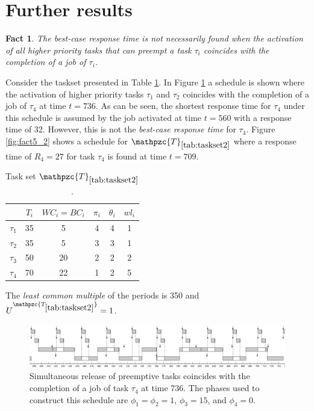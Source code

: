 \documentclass[fleqn]{article}
\newtheorem{fact}{Fact}
\begin{document}
\section*{Further results}

\begin{fact}
	The \textit{best-case response time} is not necessarily found when the activation of all higher priority tasks that can preempt a task $\tau_i$ coincides with the completion of a job of $\tau_i$.
\end{fact}

Consider the taskset presented in Table \ref{tab:taskset2}. In Figure \ref{fig:fact5_1} a schedule is shown where the activation of higher priority tasks $\tau_1$ and $\tau_2$ coincides with the completion of a job of $\tau_4$ at time $t=736$. As can be seen, the shortest response time for $\tau_4$ under this schedule is assumed by the job activated at time $t=560$ with a response time of 32. However, this is not the \textit{best-case response time} for $\tau_4$. Figure \ref{fig:fact5_2} shows a schedule for $\mathpzc{T}_{\ref{tab:taskset2}}$ where a response time of $R_4=27$ for task $\tau_4$ is found at time $t=709$. 
\begin{table}[H]
	\center
	\caption{Task set $\mathpzc{T}_{\ref{tab:taskset2}}$.}
	\label{tab:taskset2}
	\begin{tabular}{c c c c c | c}
		\hline 
		& $T_i$ & $WC_i=BC_i$ & $\pi_i$ & $\theta_i$ &  $wl_i$\\ 
		\hline 
		$\tau_1$& 35 & 5  & 4 & 4 &  1 \\ 
		$\tau_2$& 35 & 5  & 3 & 3 &  1 \\ 
		$\tau_3$& 50 & 20 & 2 & 2 &  2 \\ 
		$\tau_4$& 70 & 22 & 1 & 2 &  5 \\
		\hline 
	\end{tabular}
	\small
	\item The \textit{least common multiple} of the periods is 350 and $U^{\mathpzc{T_{\ref{tab:taskset2}}}}=1$.
\end{table} 

\begin{figure}[H]
	\centering
	\includegraphics[width=1.1\linewidth]{figures/fact5_1}
	\caption{Simultaneous release of preemptive tasks coincides with the completion of a job of task $\tau_4$ at time 736. The phases used to construct this schedule are $\phi_1 = \phi_2 = 1$, $\phi_3 = 15$, and $\phi_4 = 0$.}
	\label{fig:fact5_1}
\end{figure}
\end{document}
